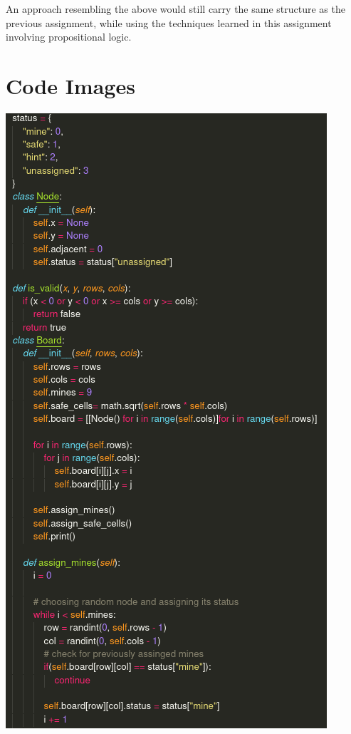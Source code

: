 \documentclass{article}
\begin{document}
		An approach resembling the above would still carry the same structure as the previous assignment,
		while using the techniques learned in this assignment involving propositional logic.
\section{Code Images}
\includegraphics[scale=0.5]{s1.png}
\end{document}
